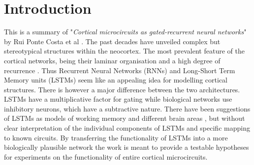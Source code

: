\section{Introduction}
This is a summary of "\textit{Cortical microcircuits as gated-recurrent neural networks}" by Rui Ponte Costa et al \cite{PonteCosta2017}.
The past decades have unveiled complex but stereotypical structures within the neocortex. The most prevalent feature of the cortical networks, being their laminar organisation and a high degree of recurrence \cite{douglas_koch_mahowald_martin_suarez_1995, jiang_shen_cadwell_berens_sinz_ecker_patel_tolias_2015}. Thus Recurrent Neural Networks (RNNs) and Long-Short Term Memory units (LSTMs) seem like an appealing idea for modelling cortical structures. There is however a major difference between the two architectures. LSTMs have a multiplicative factor for gating while biological networks use inhibitory neurons, which have a subtractive nature. There have been suggestions of LSTMs as models of working memory and different brain areas \cite{krueger_dayan_2009}, but without clear interpretation of the individual components of LSTMs and specific mapping to known circuits.
By transferring the functionality of LSTMs into a more biologically plausible network the work is meant to provide a testable hypotheses for experiments on the functionality of entire cortical microcircuits.